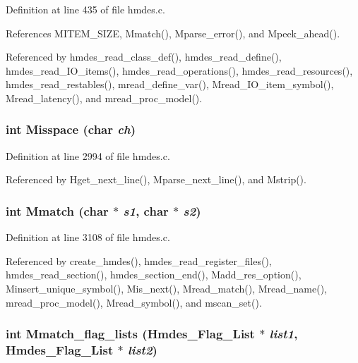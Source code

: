 Definition at line 435 of file hmdes.c.

References MITEM\_\-SIZE, Mmatch(), Mparse\_\-error(), and Mpeek\_\-ahead().

Referenced by hmdes\_\-read\_\-class\_\-def(), hmdes\_\-read\_\-define(), hmdes\_\-read\_\-IO\_\-items(), hmdes\_\-read\_\-operations(), hmdes\_\-read\_\-resources(), hmdes\_\-read\_\-restables(), mread\_\-define\_\-var(), Mread\_\-IO\_\-item\_\-symbol(), Mread\_\-latency(), and mread\_\-proc\_\-model().
\subsubsection{\setlength{\rightskip}{0pt plus 5cm}int Misspace (char {\em ch})}\label{hmdes_8c_7812dadb15947686c187df7d3d07ffbc}




Definition at line 2994 of file hmdes.c.

Referenced by Hget\_\-next\_\-line(), Mparse\_\-next\_\-line(), and Mstrip().
\subsubsection{\setlength{\rightskip}{0pt plus 5cm}int Mmatch (char $\ast$ {\em s1}, char $\ast$ {\em s2})}\label{hmdes_8c_d168399f07589e6ab6fad5c3ca7c6336}




Definition at line 3108 of file hmdes.c.

Referenced by create\_\-hmdes(), hmdes\_\-read\_\-register\_\-files(), hmdes\_\-read\_\-section(), hmdes\_\-section\_\-end(), Madd\_\-res\_\-option(), Minsert\_\-unique\_\-symbol(), Mis\_\-next(), Mread\_\-match(), Mread\_\-name(), mread\_\-proc\_\-model(), Mread\_\-symbol(), and mscan\_\-set().
\subsubsection{\setlength{\rightskip}{0pt plus 5cm}int Mmatch\_\-flag\_\-lists (\bf{Hmdes\_\-Flag\_\-List} $\ast$ {\em list1}, \bf{Hmdes\_\-Flag\_\-List} $\ast$ {\em list2})}\label{hmdes_8c_061dc0415202f6c4f9e89f83b5fe543b}




